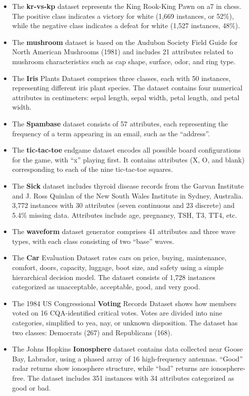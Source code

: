 \begin{itemize}
    \item The \textbf{kr-vs-kp} dataset represents the King Rook-King Pawn on a7 in chess. The positive class indicates a victory for white (1,669 instances, or 52\%), while the negative class indicates a defeat for white (1,527 instances, 48\%).
    \item The \textbf{mushroom} dataset is based on the Audubon Society Field Guide for North American Mushrooms (1981) and includes 21 attributes related to mushroom characteristics such as cap shape, surface, odor, and ring type.
    \item The \textbf{Iris} Plants Dataset comprises three classes, each with 50 instances, representing different iris plant species. The dataset contains four numerical attributes in centimeters: sepal length, sepal width, petal length, and petal width.
    \item The \textbf{Spambase} dataset consists of 57 attributes, each representing the frequency of a term appearing in an email, such as the ``address''.
    \item The \textbf{tic-tac-toe} endgame dataset encodes all possible board configurations for the game, with ``x'' playing first. It contains attributes (X, O, and blank) corresponding to each of the nine tic-tac-toe squares.
    \item The \textbf{Sick} dataset includes thyroid disease records from the Garvan Institute and J. Ross Quinlan of the New South Wales Institute in Sydney, Australia. 3,772 instances with 30 attributes (seven continuous and 23 discrete) and 5.4\% missing data. Attributes include age, pregnancy, TSH, T3, TT4, etc.
    \item The \textbf{waveform} dataset generator comprises 41 attributes and three wave types, with each class consisting of two ``base'' waves.
    \item The \textbf{Car} Evaluation Dataset rates cars on price, buying, maintenance, comfort, doors, capacity, luggage, boot size, and safety using a simple hierarchical decision model. The dataset consists of 1,728 instances categorized as unacceptable, acceptable, good, and very good.
    \item The 1984 US Congressional \textbf{Voting} Records Dataset shows how members voted on 16 CQA-identified critical votes. Votes are divided into nine categories, simplified to yea, nay, or unknown disposition. The dataset has two classes: Democrats (267) and Republicans (168).
    \item The Johns Hopkins \textbf{Ionosphere} dataset contains data collected near Goose Bay, Labrador, using a phased array of 16 high-frequency antennas. ``Good'' radar returns show ionosphere structure, while ``bad'' returns are ionosphere-free. The dataset includes 351 instances with 34 attributes categorized as good or bad.
\end{itemize}
